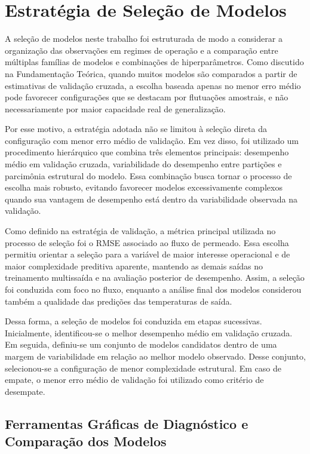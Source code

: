 \section{Estratégia de Seleção de Modelos}
\label{sec:selecao_modelos}

A seleção de modelos neste trabalho foi estruturada de modo a considerar a organização das observações em regimes de operação e a comparação entre múltiplas famílias de modelos e combinações de hiperparâmetros. Como discutido na Fundamentação Teórica, quando muitos modelos são comparados a partir de estimativas de validação cruzada, a escolha baseada apenas no menor erro médio pode favorecer configurações que se destacam por flutuações amostrais, e não necessariamente por maior capacidade real de generalização.

Por esse motivo, a estratégia adotada não se limitou à seleção direta da configuração com menor erro médio de validação. Em vez disso, foi utilizado um procedimento hierárquico que combina três elementos principais: desempenho médio em validação cruzada, variabilidade do desempenho entre partições e parcimônia estrutural do modelo. Essa combinação busca tornar o processo de escolha mais robusto, evitando favorecer modelos excessivamente complexos quando sua vantagem de desempenho está dentro da variabilidade observada na validação.

Como definido na estratégia de validação, a métrica principal utilizada no processo de seleção foi o RMSE associado ao fluxo de permeado. Essa escolha permitiu orientar a seleção para a variável de maior interesse operacional e de maior complexidade preditiva aparente, mantendo as demais saídas no treinamento multissaída e na avaliação posterior de desempenho. Assim, a seleção foi conduzida com foco no fluxo, enquanto a análise final dos modelos considerou também a qualidade das predições das temperaturas de saída.

Dessa forma, a seleção de modelos foi conduzida em etapas sucessivas. Inicialmente, identificou-se o melhor desempenho médio em validação cruzada. Em seguida, definiu-se um conjunto de modelos candidatos dentro de uma margem de variabilidade em relação ao melhor modelo observado. Desse conjunto, selecionou-se a configuração de menor complexidade estrutural. Em caso de empate, o menor erro médio de validação foi utilizado como critério de desempate.

\subsection{Ferramentas Gráficas de Diagnóstico e Comparação dos Modelos}


